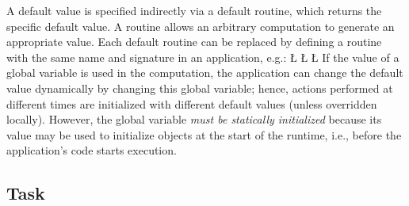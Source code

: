 \documentclass[openright,twoside]{report}
\begin{document}
A default value is specified indirectly via a default routine, which returns the specific default value.
A routine allows an arbitrary computation to generate an appropriate value.
Each default routine can be replaced by defining a routine with the same name and signature in an application, e.g.:
\LGinlinefalse\LGbegin\lgrinde
\L{}
\L{\LB{}}
\CE{}\L{\LB{\}}}
\endlgrinde\LGend
If the value of a global variable is used in the computation, the application can change the default value dynamically by changing this global variable;
hence, actions performed at different times are initialized with different default values (unless overridden locally).
However, the global variable \emph{must be statically initialized} because its value may be used to initialize objects at the start of the \uC runtime, i.e., before the application's code starts execution.


\subsection{Task}
\end{document}
